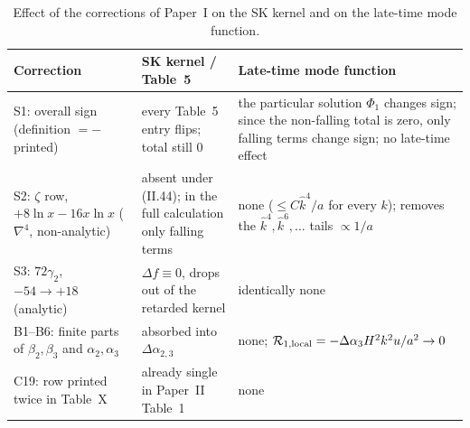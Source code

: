 \documentclass[aps,prd,onecolumn,10pt,nofootinbib,floatfix]{revtex4-2}
\newcommand{\PI}{Paper~I}
\newcommand{\PII}{Paper~II}
\newcommand{\eqII}[1]{(II.#1)}
\newcommand{\khat}{\hat k}
\begin{document}
\begin{table}[htbp]
\caption{Effect of the corrections of \PI{} on the SK kernel and on the late-time mode function.}
\label{tab:s6:effect}
\renewcommand{\arraystretch}{1.25}
\begin{ruledtabular}
\begin{tabular}{>{\raggedright\arraybackslash}p{} >{\raggedright\arraybackslash}p{} >{\raggedright\arraybackslash}p{}}
Correction & SK kernel / Table~5 & Late-time mode function\\
\hline
S1: overall sign (definition $=-$printed) & every Table~5 entry flips; total still $0$ &
the particular solution $\Phi_1$ changes sign; since the non-falling total is zero, only falling terms change sign; no late-time effect\\
S2: $\zeta$ row, $+8\ln x-16x\ln x$ ($\nabla^4$, non-analytic) & absent under \eqII{44}; in the full calculation only falling
terms & none ($\le C\khat^4/a$ for every $k$); removes the $\khat^{4},\khat^6,\ldots$ tails $\propto1/a$\\
S3: $72\gamma_2$, $-54\to+18$ (analytic) & $\Delta f\equiv0$, drops out of the retarded kernel & identically none\\
B1--B6: finite parts of $\beta_2,\beta_3$ and $\alpha_2,\alpha_3$ & absorbed into $\Delta\alpha_{2,3}$ & none; $\mathcal{R}_{1,\rm local}=-\Delta\alpha_3H^2k^2u/a^2\to0$\\
C19: row printed twice in Table~X & already single in \PII{} Table~1 & none\\
\end{tabular}
\end{ruledtabular}
\end{table}
\end{document}
